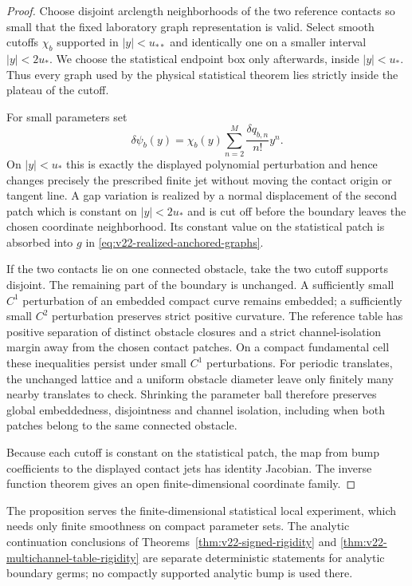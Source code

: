\begin{proof}
Choose disjoint arclength neighborhoods of the two reference contacts so
small that the fixed laboratory graph representation is valid.  Select smooth
cutoffs $\chi_b$ supported in $|y|<u_{**}$ and identically one on a smaller
interval $|y|<2u_*$.  We choose the statistical endpoint box only afterwards,
inside $|y|<u_*$.  Thus every graph used by the physical statistical theorem
lies strictly inside the plateau of the cutoff.

For small parameters set
\begin{equation}\label{eq:v22-local-bump}
 \delta\psi_b(y)
 =\chi_b(y)\sum_{n=2}^M\frac{\delta q_{b,n}}{n!}y^n.
\end{equation}
On $|y|<u_*$ this is exactly the displayed polynomial perturbation and hence
changes precisely the prescribed finite jet without moving the contact
origin or tangent line.  A gap variation is realized by a normal displacement
of the second patch which is constant on $|y|<2u_*$ and is cut off before the
boundary leaves the chosen coordinate neighborhood.  Its constant value on
the statistical patch is absorbed into $g$ in
\eqref{eq:v22-realized-anchored-graphs}.

If the two contacts lie on one connected obstacle, take the two cutoff
supports disjoint.  The remaining part of the boundary is unchanged.  A
sufficiently small $C^1$ perturbation of an embedded compact curve remains
embedded; a sufficiently small $C^2$ perturbation preserves strict positive
curvature.  The reference table has positive separation of distinct obstacle
closures and a strict channel-isolation margin away from the chosen contact
patches.  On a compact fundamental cell these inequalities persist under
small $C^1$ perturbations.  For periodic translates, the unchanged lattice
and a uniform obstacle diameter leave only finitely many nearby translates to
check.  Shrinking the parameter ball therefore preserves global embeddedness,
disjointness and channel isolation, including when both patches belong to the
same connected obstacle.

Because each cutoff is constant on the statistical patch, the map from bump
coefficients to the displayed contact jets has identity Jacobian.  The
inverse function theorem gives an open finite-dimensional coordinate family.
\end{proof}

\begin{remark}
The proposition serves the finite-dimensional statistical local experiment,
which needs only finite smoothness on compact parameter sets.  The analytic
continuation conclusions of Theorems~\ref{thm:v22-signed-rigidity} and
\ref{thm:v22-multichannel-table-rigidity} are separate deterministic
statements for analytic boundary germs; no compactly supported analytic bump
is used there.
\end{remark}
